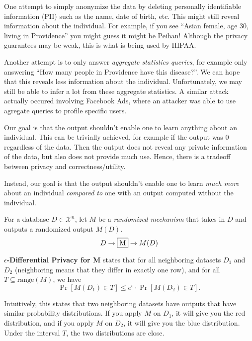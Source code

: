 One attempt to simply anonymize the data by deleting personally identifiable information (PII) such as the name, date of birth, etc. This might still reveal information about the individual. For example, if you see ``Asian female, age 30, living in Providence'' you might guess it might be Peihan! Although the privacy guarantees may be weak, this is what is being used by HIPAA.

Another attempt is to only answer \textit{aggregate statistics queries}, for example only answering ``How many people in Providence have this disease?''. We can hope that this reveals less information about the individual. Unfortunately, we may still be able to infer a lot from these aggregate statistics. A similar attack actually occured involving Facebook Ads, where an attacker was able to use agregate queries to profile specific users.

Our goal is that the output shouldn't enable one to learn anything about an individual. This can be trivially achieved, for example if the output was 0 regardless of the data. Then the output does not reveal any private information of the data, but also does not provide much use. Hence, there is a tradeoff between privacy and correctness/utility.

Instead, our goal is that the output shouldn't enable one to learn \textit{much more} about an individual \textit{compared to} one with an output computed without the individual.

\begin{definition}
    For a database $D \in \mathcal{X}^n$, let $M$ be a \textit{randomized mechanism} that takes in $D$ and outputs a randomized output $M(D)$.
    $$D  \to \fbox{M} \to M(D)$$

    \textbf{$\epsilon$-Differential Privacy for M} states that for all neighboring datasets $D_1$ and $D_2$ (neighboring means that they differ in exactly one row), and for all $T \subseteq \text{range}(M)$, we have
    $$\Pr [M(D_1) \in T] \leq e^{\epsilon} \cdot \Pr[M(D_2) \in T].$$
\end{definition}

Intuitively, this states that two neighboring datasets have outputs that have similar probability distributions. If you apply $M$ on $D_1$, it will give you the red distribution, and if you apply $M$ on $D_2$, it will give you the blue distribution. Under the interval $T$, the two distributions are close.

\begin{center}
    \def\svgwidth{0.5\linewidth}
    
\end{center}


